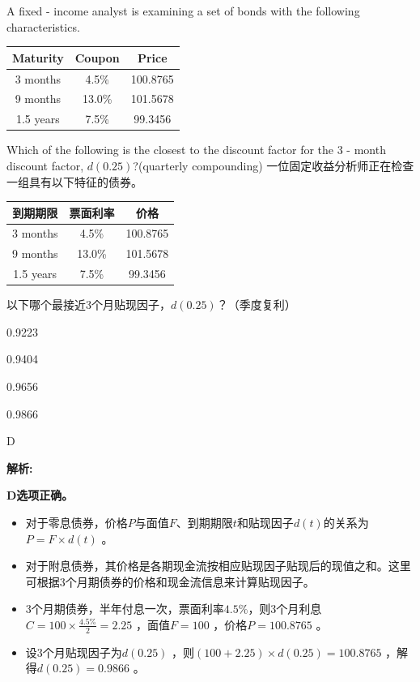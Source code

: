 \documentclass{article}
\newcounter{question} %
\newenvironment{explanation}
{\textbf{解析:}\par}
{\par}
\begin{document}
\begin{question}
    A fixed - income analyst is examining a set of bonds with the following characteristics.
    \begin{center}
    \begin{tabular}{|c|c|c|}
    \hline
    Maturity & Coupon & Price \\
    \hline
    3 months & 4.5\% & 100.8765 \\
    \hline
    9 months & 13.0\% & 101.5678 \\
    \hline
    1.5 years & 7.5\% & 99.3456 \\
    \hline
    \end{tabular}
    \end{center}
    Which of the following is the closest to the discount factor for the 3 - month discount factor, \(d(0.25)\)?(quarterly compounding)
    一位固定收益分析师正在检查一组具有以下特征的债券。
    \begin{center}
    \begin{tabular}{|c|c|c|}
    \hline
    到期期限 & 票面利率 & 价格 \\
    \hline
    3 months & 4.5\% & 100.8765 \\
    \hline
    9 months & 13.0\% & 101.5678 \\
    \hline
    1.5 years & 7.5\% & 99.3456 \\
    \hline
    \end{tabular}
    \end{center}
    以下哪个最接近3个月贴现因子，\(d(0.25)\)？（季度复利）
    \end{question}
    
    \begin{choices}
        \item 0.9223
        \item 0.9404
        \item 0.9656
        \item 0.9866
    \end{choices}
    
    \begin{correctanswer}
        D
    \end{correctanswer}
    
    \begin{explanation}
    \textbf{D选项正确。}
    \begin{itemize}
        \item 对于零息债券，价格\(P\)与面值\(F\)、到期期限\(t\)和贴现因子\(d(t)\)的关系为\(P = F\times d(t)\) 。
        \item 对于附息债券，其价格是各期现金流按相应贴现因子贴现后的现值之和。这里可根据3个月期债券的价格和现金流信息来计算贴现因子。  
        \item 3个月期债券，半年付息一次，票面利率\(4.5\%\)，则3个月利息\(C = 100\times\frac{4.5\%}{2}= 2.25\) ，面值\(F = 100\) ，价格\(P = 100.8765\) 。
        \item 设3个月贴现因子为\(d(0.25)\) ，则\((100+2.25)\times d(0.25)=100.8765\) ，解得\(d(0.25)=0.9866\) 。
    \end{itemize}
    \end{explanation}
    
\end{document}

